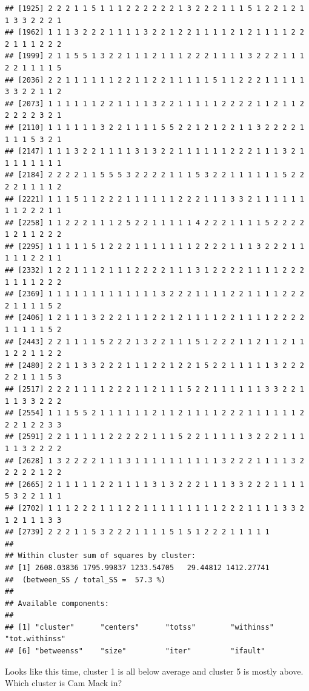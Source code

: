 \documentclass[
]{book}
\newenvironment{Shaded}{\begin{snugshade}}{\end{snugshade}}
\newcommand{\FunctionTok}[1]{\textcolor[rgb]{0.00,0.00,0.00}{#1}}
\newcommand{\NormalTok}[1]{#1}
\newcommand{\OtherTok}[1]{\textcolor[rgb]{0.56,0.35,0.01}{#1}}
\newcommand{\SpecialCharTok}[1]{\textcolor[rgb]{0.00,0.00,0.00}{#1}}
\begin{document}
\begin{verbatim}
## [1925] 2 2 2 1 1 5 1 1 1 2 2 2 2 2 2 1 3 2 2 2 1 1 1 5 1 2 2 1 2 1 1 3 3 2 2 2 1
## [1962] 1 1 1 3 2 2 2 1 1 1 1 3 2 2 1 2 2 1 1 1 1 2 1 2 1 1 1 1 2 2 2 1 1 1 2 2 2
## [1999] 2 1 1 5 5 1 3 2 2 1 1 1 2 1 1 1 2 2 2 1 1 1 1 3 2 2 2 1 1 1 2 2 1 1 1 1 5
## [2036] 2 2 1 1 1 1 1 1 2 2 1 1 2 2 1 1 1 1 1 5 1 1 2 2 2 1 1 1 1 1 3 3 2 2 1 1 2
## [2073] 1 1 1 1 1 1 2 2 1 1 1 1 3 2 2 1 1 1 1 1 2 2 2 2 1 1 2 1 1 2 2 2 2 2 3 2 1
## [2110] 1 1 1 1 1 1 3 2 2 1 1 1 1 5 5 2 2 1 2 1 2 2 1 1 3 2 2 2 2 1 1 1 1 5 3 2 1
## [2147] 1 1 1 3 2 2 1 1 1 1 3 1 3 2 2 1 1 1 1 1 1 2 2 2 1 1 1 3 2 1 1 1 1 1 1 1 1
## [2184] 2 2 2 2 1 1 5 5 5 3 2 2 2 2 1 1 1 5 3 2 2 1 1 1 1 1 1 5 2 2 2 2 1 1 1 1 2
## [2221] 1 1 1 5 1 1 2 2 2 1 1 1 1 1 1 2 2 2 1 1 1 3 3 2 1 1 1 1 1 1 1 1 2 2 2 1 1
## [2258] 1 1 2 2 2 1 1 1 2 5 2 2 1 1 1 1 1 4 2 2 2 1 1 1 1 5 2 2 2 2 1 2 1 1 2 2 2
## [2295] 1 1 1 1 1 5 1 2 2 2 1 1 1 1 1 1 1 2 2 2 2 1 1 1 3 2 2 2 1 1 1 1 1 2 2 1 1
## [2332] 1 2 2 1 1 1 2 1 1 1 2 2 2 2 1 1 1 3 1 2 2 2 2 1 1 1 1 2 2 2 1 1 1 1 2 2 2
## [2369] 1 1 1 1 1 1 1 1 1 1 1 1 1 3 2 2 2 1 1 1 1 2 2 1 1 1 1 2 2 2 2 1 1 1 1 5 2
## [2406] 1 2 1 1 1 3 2 2 2 1 1 1 2 2 1 2 1 1 1 1 2 2 1 1 1 1 2 2 2 2 1 1 1 1 1 5 2
## [2443] 2 2 1 1 1 1 5 2 2 2 1 3 2 2 1 1 1 5 1 2 2 2 1 1 2 1 1 2 1 1 1 2 2 1 1 2 2
## [2480] 2 2 1 1 3 3 2 2 2 1 1 1 2 2 1 2 2 1 5 2 2 1 1 1 1 1 3 2 2 2 2 2 1 1 1 5 3
## [2517] 2 2 2 1 1 1 1 2 2 2 1 1 2 1 1 1 5 2 2 1 1 1 1 1 1 3 3 2 2 1 1 1 3 3 2 2 2
## [2554] 1 1 1 5 5 2 1 1 1 1 1 1 2 1 1 2 1 1 1 1 2 2 2 1 1 1 1 1 1 2 2 2 1 2 2 3 3
## [2591] 2 2 1 1 1 1 1 2 2 2 2 2 1 1 1 5 2 2 1 1 1 1 1 3 2 2 2 1 1 1 1 1 3 2 2 2 2
## [2628] 1 3 2 2 2 2 1 1 1 3 1 1 1 1 1 1 1 1 1 1 3 2 2 2 1 1 1 1 3 2 2 2 2 2 1 2 2
## [2665] 2 1 1 1 1 1 2 2 1 1 1 1 3 1 3 2 2 2 1 1 1 3 3 2 2 2 1 1 1 1 5 3 2 2 1 1 1
## [2702] 1 1 1 2 2 2 1 1 1 2 2 1 1 1 1 1 1 1 1 1 2 2 2 1 1 1 1 3 3 2 1 2 1 1 1 3 3
## [2739] 2 2 2 1 1 5 3 2 2 2 1 1 1 1 5 1 5 1 2 2 2 1 1 1 1 1
## 
## Within cluster sum of squares by cluster:
## [1] 2608.03836 1795.99837 1233.54705   29.44812 1412.27741
##  (between_SS / total_SS =  57.3 %)
## 
## Available components:
## 
## [1] "cluster"      "centers"      "totss"        "withinss"     "tot.withinss"
## [6] "betweenss"    "size"         "iter"         "ifault"
\end{verbatim}

Looks like this time, cluster 1 is all below average and cluster 5 is mostly above. Which cluster is Cam Mack in?

\begin{Shaded}
\end{Shaded}
\end{document}
